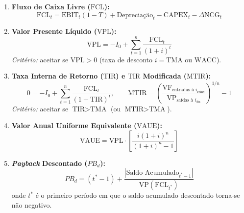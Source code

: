 \begin{boxFormula}
\begin{enumerate}[leftmargin=1.5em, itemsep=4pt, resume]
  \item \textbf{Fluxo de Caixa Livre ($\text{FCL}$):}
  \[
  \text{FCL}_t = \text{EBIT}_t(1 - T) + \text{Depreciação}_t - \text{CAPEX}_t - \Delta \text{NCG}_t
  \]

  \item \textbf{Valor Presente Líquido ($\text{VPL}$):}
  \[
  \text{VPL} = -I_0 + \sum_{t=1}^{n} \frac{\text{FCL}_t}{(1 + i)^t}
  \]
  \textit{Critério:} aceitar se $\text{VPL} > 0$ (taxa de desconto $i = \text{TMA}$ ou $\text{WACC}$).

  \item \textbf{Taxa Interna de Retorno ($\text{TIR}$) e $\text{TIR}$ Modificada ($\text{MTIR}$):}
  \[
  0 = -I_0 + \sum_{t=1}^{n} \frac{\text{FCL}_t}{(1 + \text{TIR})^t}, \qquad \text{MTIR} = \left(\frac{\text{VF}_{\text{entradas à } i_{\text{reinv}}}}{\text{VP}_{\text{saídas à } i_{\text{fin}}}}\right)^{1/n} - 1
  \]
  \textit{Critério:} aceitar se $\text{TIR} > \text{TMA}$ (ou $\text{MTIR} > \text{TMA}$).

  \item \textbf{Valor Anual Uniforme Equivalente ($\text{VAUE}$):}
  \[
  \text{VAUE} = \text{VPL} \cdot \left[\frac{i(1 + i)^n}{(1 + i)^n - 1}\right]
  \]

  \item \textbf{\textit{Payback} Descontado ($PB_d$):}
  \[
  PB_d = (t^* - 1) + \frac{\left|\text{Saldo Acumulado}_{t^*-1}\right|}{\text{VP}(\text{FCL}_{t^*})}
  \]
  onde $t^*$ é o primeiro período em que o saldo acumulado descontado torna-se não negativo.
\end{enumerate}
\end{boxFormula}

